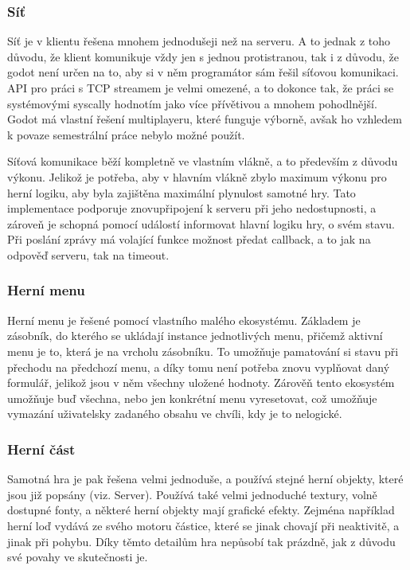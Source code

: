 \documentclass[12pt, a4paper]{article}
\begin{document}
    \subsubsection{Síť}
    Síť je v klientu řešena mnohem jednodušeji než na serveru.
    A to jednak z toho důvodu, že klient komunikuje vždy jen s jednou protistranou, tak i z důvodu, že godot není určen na to, aby si v něm programátor sám řešil síťovou komunikaci.
    API pro práci s TCP streamem je velmi omezené, a to dokonce tak, že práci se systémovými syscally hodnotím jako více přívětivou a mnohem pohodlnější.
    Godot má vlastní řešení multiplayeru, které funguje výborně, avšak ho vzhledem k povaze semestrální práce nebylo možné použít.

    Síťová komunikace běží kompletně ve vlastním vlákně, a to především z důvodu výkonu.
    Jelikož je potřeba, aby v hlavním vlákně zbylo maximum výkonu pro herní logiku, aby byla zajištěna maximální plynulost samotné hry.
    Tato implementace podporuje znovupřipojení k serveru při jeho nedostupnosti, a zároveň je schopná pomocí událostí informovat hlavní logiku hry, o svém stavu.
    Při poslání zprávy má volající funkce možnost předat callback, a to jak na odpověď serveru, tak na timeout.

    \subsubsection{Herní menu}
    Herní menu je řešené pomocí vlastního malého ekosystému.
    Základem je zásobník, do kterého se ukládají instance jednotlivých menu, přičemž aktivní menu je to, která je na vrcholu zásobníku.
    To umožňuje pamatování si stavu při přechodu na předchozí menu, a díky tomu není potřeba znovu vyplňovat daný formulář, jelikož jsou v něm všechny uložené hodnoty.
    Zárověň tento ekosystém umožňuje buď všechna, nebo jen konkrétní menu vyresetovat, což umožňuje vymazání uživatelsky zadaného obsahu ve chvíli, kdy je to nelogické.

    \subsubsection{Herní část}
    Samotná hra je pak řešena velmi jednoduše, a používá stejné herní objekty, které jsou již popsány (viz. Server).
    Používá také velmi jednoduché textury, volně dostupné fonty, a některé herní objekty mají grafické efekty.
    Zejména například herní loď vydává ze svého motoru částice, které se jinak chovají při neaktivitě, a jinak při pohybu.
    Díky těmto detailům hra nepůsobí tak prázdně, jak z důvodu své povahy ve skutečnosti je.
\end{document}
